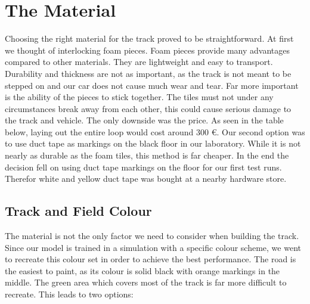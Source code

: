 \section{The Material}
Choosing the right material for the track proved to be straightforward. At first we thought of interlocking foam pieces. Foam pieces provide many advantages compared to other materials. They are lightweight and easy to transport. Durability and thickness are not as important, as the track is not meant to be stepped on and our car does not cause much wear and tear. Far more important is the ability of the pieces to stick together. The tiles must not under any circumstances break away from each other, this could cause serious damage to the track and vehicle. The only downside was the price. As seen in the table below, laying out the entire loop would cost around 300 €. Our second option was to use duct tape as markings on the black floor in our laboratory. While it is not nearly as durable as the foam tiles, this method is far cheaper. In the end the decision fell on using duct tape markings on the floor for our first test runs. Therefor white and yellow duct tape was bought at a nearby hardware store.

\subsection{Track and Field Colour}
The material is not the only factor we need to consider when building the track. Since our model is trained in a simulation with a specific colour scheme, we went to recreate this colour set in order to achieve the best performance. The road is the easiest to paint, as its colour is solid black with orange markings in the middle. The green area which covers most of the track is far more difficult to recreate. This leads to two options:

